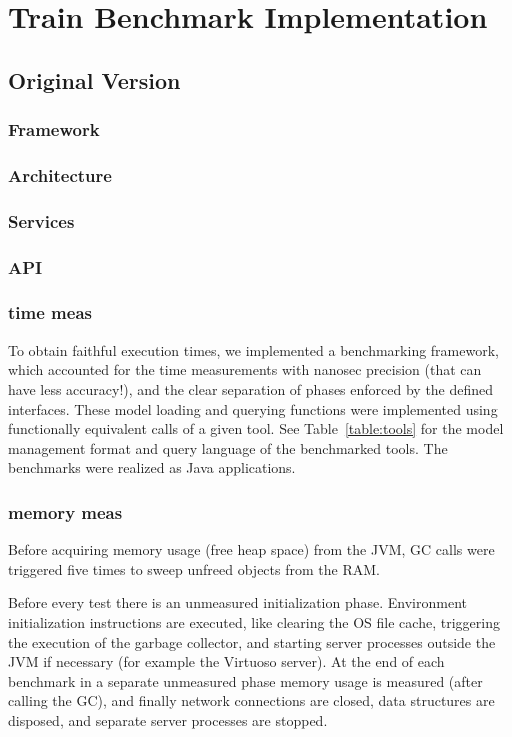\chapter{Train Benchmark Implementation}

\section{Original Version}
\subsection{Framework}
\subsection{Architecture}
\subsection{Services}
\subsection{API}

\subsection{time meas}

To obtain faithful execution times, we implemented a benchmarking framework,
which accounted for the time measurements with nanosec precision (that can have
less accuracy!), and the clear separation of phases enforced by the defined
interfaces. These model loading and querying functions were implemented using
functionally equivalent calls of a given tool. See Table~\ref{table:tools} for
the model management format and query language of the benchmarked tools. The
benchmarks were realized as Java applications.

\subsection{memory meas}
Before acquiring memory usage (free heap space) from the JVM, GC calls were triggered five times to sweep unfreed objects from the RAM.

Before every test
there is an unmeasured initialization phase. Environment initialization
instructions are executed, like clearing the OS file cache, triggering the
execution of the garbage collector, and starting server processes outside the
JVM if necessary (for example the Virtuoso server). At the end of each benchmark
in a separate unmeasured phase memory usage is measured (after calling the GC),
and finally network connections are closed, data structures are disposed, and
separate server processes are stopped.


